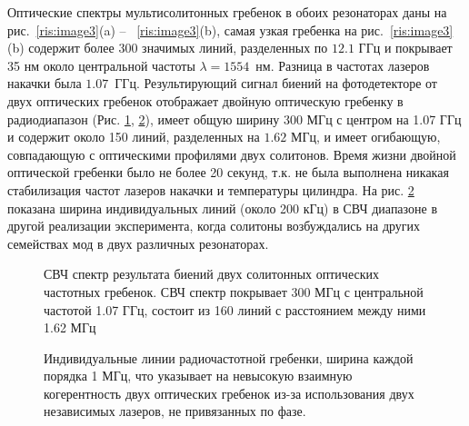 Оптические спектры мультисолитонных гребенок в обоих резонаторах даны на рис.~\ref{ris:image3}(a) -- ~\ref{ris:image3}(b), самая узкая гребенка на рис.~\ref{ris:image3}(b) содержит более 300 значимых линий, разделенных по $12.1$ ГГц и покрывает 35 нм около центральной частоты $\lambda = 1554$~нм. Разница в частотах лазеров накачки была $1.07$~ГГц. Результирующий сигнал биений на фотодетекторе от двух оптических гребенок отображает двойную оптическую гребенку в радиодиапазон (Рис. \ref{ris:image4}, \ref{ris:dual_comb_individual_lines}), имеет общую ширину 300 МГц с центром на 1.07 ГГц и содержит около 150 линий, разделенных на $1.62$ МГц, и имеет огибающую, совпадающую с оптическими профилями двух солитонов. Время жизни двойной оптической гребенки было не более 20 секунд, т.к. не была выполнена никакая стабилизация частот лазеров накачки и температуры цилиндра. На рис. \ref{ris:dual_comb_individual_lines} показана ширина индивидуальных линий (около 200 кГц) в СВЧ диапазоне в другой реализации эксперимента, когда солитоны возбуждались на других семействах мод в двух различных резонаторах.

\begin{figure}[!htb]
\begin{minipage}{1\linewidth}
\end{minipage}
\caption{СВЧ спектр результата биений двух солитонных оптических частотных гребенок. СВЧ спектр покрывает 300 МГц с центральной частотой 1.07 ГГц, состоит из 160 линий с расстоянием между ними 1.62 МГц}
\label{ris:image4}
\end{figure}

\begin{figure}[!htb]
\begin{minipage}{1\linewidth}
\end{minipage}
\caption{Индивидуальные линии радиочастотной гребенки, ширина каждой порядка 1 МГц, что указывает на невысокую взаимную когерентность двух оптических гребенок из-за использования двух независимых лазеров, не привязанных по фазе.}
\label{ris:dual_comb_individual_lines}
\end{figure}


